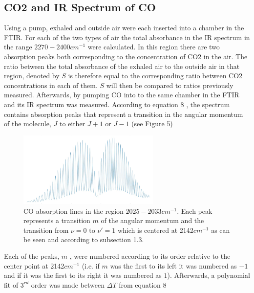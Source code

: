 \documentclass[reprint,amsmath,amssymb,aps, prl]{revtex4-2}
\begin{document}
\subsection{CO2 and IR Spectrum of CO}
Using a pump, exhaled and outside air were each inserted into a chamber in the FTIR. For each of the two types of air the total absorbance in the IR spectrum in the range $2270-2400cm^{-1}$ were
calculated. In this region there are two absorption peaks both corresponding to the concentration of CO2 in the air. The ratio between the total absorbance of the exhaled air to the outside air in that region, denoted by $S$ is therefore equal to the corresponding ratio between CO2 concentrations in each of them. $S$ will then be compared to ratios previously measured. 
Afterwards, by pumping CO into to the same chamber in the FTIR and its IR spectrum was measured.
According to equation 8 ,
the spectrum contains absorption peaks that represent a transition in the angular momentum of the molecule, $J$  to either $J+1$ or $J-1$ (see Figure 5)
\begin{figure}[h]
    \includegraphics[width=7cm]{Images/COEnergystates.jpg}
    \caption{CO absorption lines in the region $2025-2033 cm^{-1}$. Each peak represents a transition $m$ of the angular momentum and the transition from $\nu=0$ to $\nu'=1$ which is centered at 2142$cm^{-1}$  as can be seen and according to subsection 1.3.
    }
    \label{fig:CoEnergy}
    \centering
\end{figure}
Each of the peaks, $m$ , were numbered according to its order relative to the center point at 2142$cm^{-1}$ (i.e. if $m$ was the first to its left
it was numbered as $-1$ and if it was the first to its right
it was numbered as $1$). Afterwards, a polynomial fit of $3^{rd}$ order was made between $\Delta T$ from equation 8 
\end{document}
